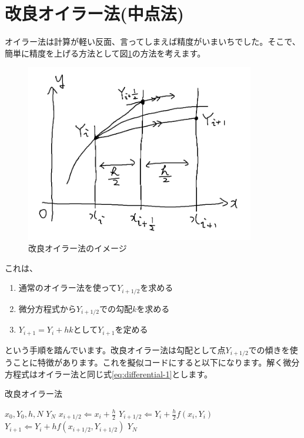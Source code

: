 \section{改良オイラー法(中点法)}
\label{adv-euler}
オイラー法は計算が軽い反面、言ってしまえば精度がいまいちでした。そこで、簡単に精度を上げる方法として図\ref{fig:4-adv-euler}の方法を考えます。

\begin{figure}[ht!]
  \centering
  \includegraphics[width=10cm]{img/4-adv-euler.png}
  \caption{改良オイラー法のイメージ}
  \label{fig:4-adv-euler}
\end{figure}

これは、

\begin{enumerate}
    \item 通常のオイラー法を使って$Y_{i+1/2}$を求める
    \item 微分方程式から$Y_{i+1/2}$での勾配$k$を求める
    \item $Y_{i+1}=Y_i+hk$として$Y_{i+1}$を定める
\end{enumerate}

という手順を踏んでいます。改良オイラー法は勾配として点$Y_{i+1/2}$での傾きを使うことに特徴があります。これを擬似コードにすると以下になります。解く微分方程式はオイラー法と同じ式\ref{eq:differential-1}とします。

\begin{algorithm}
\caption{改良オイラー法}
\begin{algorithmic}
\REQUIRE $x_0,Y_0,h,N$
\ENSURE $Y_N$
    \STATE $x_{i+1/2}\Leftarrow x_i+\frac{h}{2}$
    \STATE $Y_{i+1/2}\Leftarrow Y_i+\frac{h}{2}f(x_i,Y_i)$
    \STATE $Y_{i+1}\Leftarrow Y_i+hf(x_{i+1/2},Y_{i+1/2})$
\ENDFOR
\RETURN $Y_N$
\end{algorithmic}
\end{algorithm}

